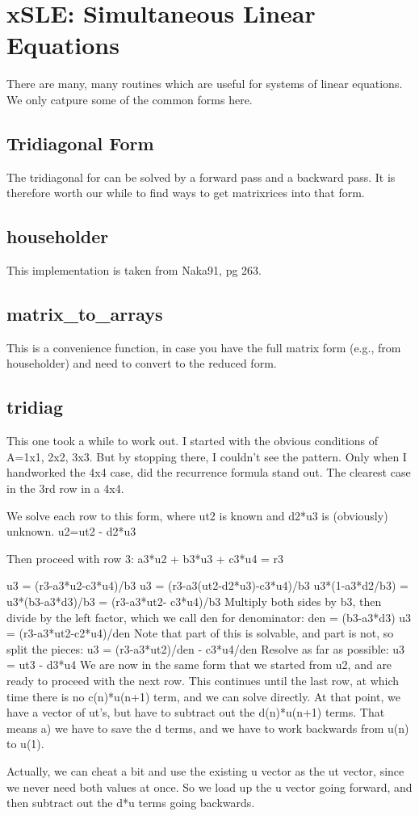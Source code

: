 \section{xSLE: Simultaneous Linear Equations}
There are many, many routines which are useful for systems of
linear equations.  We only catpure some of the common forms here.

\subsection{Tridiagonal Form}
The tridiagonal for can be solved by a forward pass and a backward pass.
It is therefore worth our while to find ways to get matrixrices into that
form.  

\subsection*{householder}
This implementation is taken from Naka91, pg 263.

\subsection*{matrix\_to\_arrays}
This is a convenience function, in case you have the full matrix form
(e.g., from householder) and need to convert to the reduced form.

\subsection*{tridiag}
This one took a while to work out.  I started with
the obvious conditions of A=1x1, 2x2, 3x3.  But by stopping
there, I couldn't see the pattern.  Only when I handworked
the 4x4 case, did the recurrence formula stand out.  The
clearest case in the 3rd row in a 4x4.

We solve each row to this form, where ut2 is known and d2*u3
is (obviously) unknown.
     u2=ut2 - d2*u3

Then proceed with row 3:
     a3*u2 + b3*u3 + c3*u4 = r3
     
     u3 = (r3-a3*u2-c3*u4)/b3
     u3 = (r3-a3(ut2-d2*u3)-c3*u4)/b3
     u3*(1-a3*d2/b3) = u3*(b3-a3*d3)/b3 = (r3-a3*ut2-
     c3*u4)/b3
Multiply both sides by b3, then divide by the left factor,
which we call den for denominator:
     den = (b3-a3*d3)
     u3 = (r3-a3*ut2-c2*u4)/den
Note that part of this is solvable, and part is not, so
split the pieces:
     u3 = (r3-a3*ut2)/den - c3*u4/den
Resolve as far as possible:
     u3 = ut3 - d3*u4
We are now in the same form that we started from u2, and are
ready to proceed with the next row.  This continues until
the last row, at which time there is no c(n)*u(n+1) term,
and we can solve directly.  At that point, we have a vector
of ut's, but have to subtract out the d(n)*u(n+1) terms.
That means a) we have to save the d terms, and we have to
work backwards from u(n) to u(1).

Actually, we can cheat a bit and use the existing u vector
as the ut vector, since we never need both values at once.
So we load up the u vector going forward, and then subtract
out the d*u terms going backwards.

